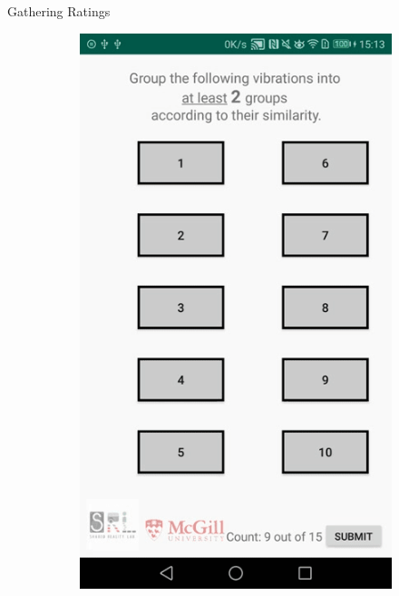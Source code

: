 

\begin{frame}{Gathering Ratings}

\begin{figure}[!htb]
\centering
\begin{subfigure}{.24\textwidth}
  \centering
  \label{fig:app_process_grouping_1}
  \includegraphics[width=\linewidth]{Images/1.png}
\end{subfigure}%
\begin{subfigure}{.24\textwidth}

\end{subfigure}
\end{figure}
\end{frame}
